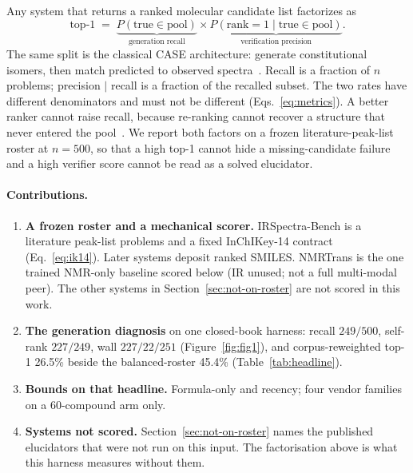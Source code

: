 \documentclass{article}
\begin{document}
Any system that returns a ranked molecular candidate list factorizes as
\begin{equation}
\label{eq:factor}
\text{top-1} \;=\; \underbrace{P(\text{true} \in \text{pool})}_{\text{generation recall}}
\times
\underbrace{P(\text{rank}=1 \mid \text{true} \in \text{pool})}_{\text{verification precision}}.
\end{equation}
The same split is the classical CASE architecture: generate constitutional
isomers, then match predicted to observed
spectra~\citep{elyashberg2015case,priessner2026reasoning}.
Recall is a fraction of $n$ problems; precision $|$ recall is a fraction of
the recalled subset.
The two rates have different denominators and must not be different
(Eqs.~\ref{eq:metrics}).
A better ranker cannot raise recall, because re-ranking cannot recover a
structure that never entered the
pool~\citep{priessner2026reasoning}.
We report both factors on a frozen literature-peak-list roster at
$n{=}500$, so that a high top-1 cannot hide a missing-candidate failure
and a high verifier score cannot be read as a solved elucidator.

\paragraph{Contributions.}
\begin{enumerate}
  \item \textbf{A frozen roster and a mechanical scorer.}
        IRSpectra-Bench is a literature peak-list problems and a fixed
        InChIKey-14 contract (Eq.~\ref{eq:ik14}).
        Later systems deposit ranked SMILES. NMRTrans is the one trained
        NMR-only baseline scored below (IR unused; not a full multi-modal
        peer). The other systems in Section~\ref{sec:not-on-roster}
        are not scored in this work.
  \item \textbf{The generation diagnosis} on one closed-book harness:
        recall $249/500$, self-rank $227/249$, wall $227/22/251$
        (Figure~\ref{fig:fig1}), and corpus-reweighted top-1 26.5\%
        beside the balanced-roster 45.4\% (Table~\ref{tab:headline}).
  \item \textbf{Bounds on that headline.}
        Formula-only and recency; four vendor families on a 60-compound arm only.
  \item \textbf{Systems not scored.}
        Section~\ref{sec:not-on-roster} names the published elucidators
        that were not run on this input.
        The factorisation above is what this harness measures without them.
\end{enumerate}
\end{document}
